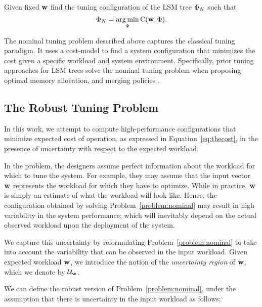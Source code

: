  \begin{problem}[{\nominal}]\label{problem:nominal}
 Given fixed ${{\bf{w}}}$  find the tuning configuration of the LSM tree ${{\Phi}}_N$ such that
\begin{equation}
\label{eq:nominal_problem}
    {{\ensuremath{\Phi}}}_N = \operatorname*{arg\,min}_{{{\Phi}}} {{\text{C}}}({{\bf{w}}}, {{\Phi}}).
\end{equation}
\end{problem}

\noindent The nominal tuning problem described above 
captures the classical tuning paradigm. It uses a
cost-model to find a system configuration that 
minimizes the cost given a specific workload and 
system environment. Specifically, prior tuning
approaches for LSM trees solve the nominal tuning
problem when proposing optimal memory allocation,
and merging policies \cite{Dayan2017,Dayan2018a,Luo2020a}.



\subsection{The Robust Tuning Problem}
\label{subsec:robust-tuning}

In this work, we attempt to compute high-performance configurations that minimize
    expected cost of operation, as expressed in Equation~\eqref{eq:thecost}, 
    in the presence of uncertainty with respect to the expected workload.

In the {\nominal} problem, the designers assume perfect information about the 
    workload for which to tune the system. For example, they may assume that the
    input vector ${{\bf{w}}}$ represents the workload for which they have to
    optimize. While in practice, ${{\bf{w}}}$ is simply an estimate of what the
    workload will look like.
Hence, the configuration obtained by solving Problem~\ref{problem:nominal} may
    result in high variability in the system performance; which will inevitably
    depend on the actual observed workload upon the deployment of the system. 
    
We capture this uncertainty by reformulating Problem~\ref{problem:nominal} to
    take into account the variability that can be observed in the input workload. 
Given expected workload ${{\bf{w}}}$, we introduce the notion of the
    \emph{uncertainty region} of ${{\bf{w}}}$, which we denote by
    $\mathcal{U}_{{\bf{w}}}$.

We can define the robust version of Problem~\ref{problem:nominal}, under the 
assumption that there is uncertainty in the input workload as follows:

